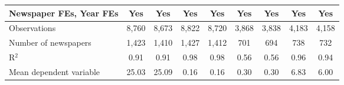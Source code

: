 {\begin{tabular}{l*{8}{c}}
\addlinespace
Newspaper FEs, Year FEs &         Yes         &         Yes         &         Yes         &         Yes         &         Yes         &         Yes         &         Yes         &         Yes         \\
\midrule
Observations        &       8,760         &       8,673         &       8,822         &       8,720         &       3,868         &       3,838         &       4,183         &       4,158         \\
Number of newspapers&       1,423         &       1,410         &       1,427         &       1,412         &         701         &         694         &         738         &         732         \\
R$^2$               &        0.91         &        0.91         &        0.98         &        0.98         &        0.56         &        0.56         &        0.96         &        0.94         \\
Mean dependent variable&       25.03         &       25.09         &        0.16         &        0.16         &        0.30         &        0.30         &        6.83         &        6.00         \\
\bottomrule
\end{tabular}
}
